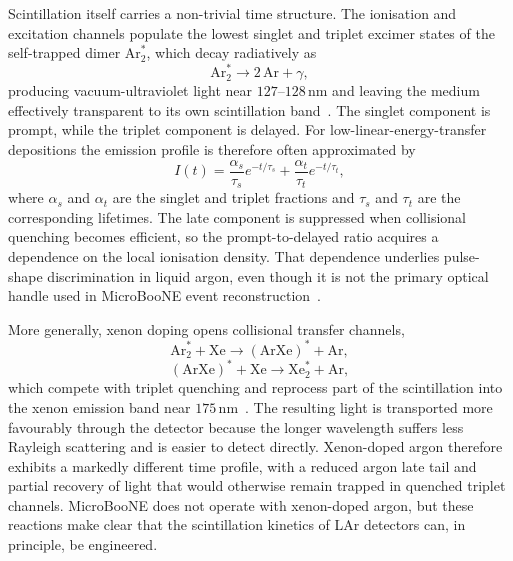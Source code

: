 Scintillation itself carries a non-trivial time structure. The ionisation and
excitation channels populate the lowest singlet and triplet excimer states of
the self-trapped dimer \(\mathrm{Ar}_2^*\), which decay radiatively as
\begin{equation}
  \mathrm{Ar}_2^*
  \to
  2\,\mathrm{Ar} + \gamma,
  \label{eq:ch3-excimer-radiative-decay}
\end{equation}
producing vacuum-ultraviolet light near \(127\text{--}128\,\mathrm{nm}\) and
leaving the medium effectively transparent to its own scintillation
band~\cite{Hitachi1983,Doke2002}. The singlet component is prompt, while the
triplet component is delayed. For low-linear-energy-transfer depositions the
emission profile is therefore often approximated by
\begin{equation}
  I(t)
  =
  \frac{\alpha_s}{\tau_s}e^{-t/\tau_s}
  +
  \frac{\alpha_t}{\tau_t}e^{-t/\tau_t},
  \label{eq:ch3-scintillation-time-profile}
\end{equation}
where \(\alpha_s\) and \(\alpha_t\) are the singlet and triplet fractions and
\(\tau_s\) and \(\tau_t\) are the corresponding lifetimes. The late component
is suppressed when collisional quenching becomes efficient, so the
prompt-to-delayed ratio acquires a dependence on the local ionisation density.
That dependence underlies pulse-shape discrimination in liquid argon, even
though it is not the primary optical handle used in MicroBooNE event
reconstruction~\cite{Hitachi1983}.

More generally, xenon doping opens collisional transfer channels,
\begin{equation}
  \mathrm{Ar}_2^* + \mathrm{Xe}
  \to
  (\mathrm{ArXe})^* + \mathrm{Ar},
  \label{eq:ch3-arxe-transfer}
\end{equation}
\begin{equation}
  (\mathrm{ArXe})^* + \mathrm{Xe}
  \to
  \mathrm{Xe}_2^* + \mathrm{Ar},
  \label{eq:ch3-xe2-transfer}
\end{equation}
which compete with triplet quenching and reprocess part of the scintillation
into the xenon emission band near \(175\,\mathrm{nm}\)~\cite{McFadden2021}.
The resulting light is transported more favourably through the detector
because the longer wavelength suffers less Rayleigh scattering and is easier
to detect directly. Xenon-doped argon therefore exhibits a markedly different
time profile, with a reduced argon late tail and partial recovery of light
that would otherwise remain trapped in quenched triplet channels. MicroBooNE
does not operate with xenon-doped argon, but these reactions make clear that
the scintillation kinetics of LAr detectors can, in principle, be engineered.

